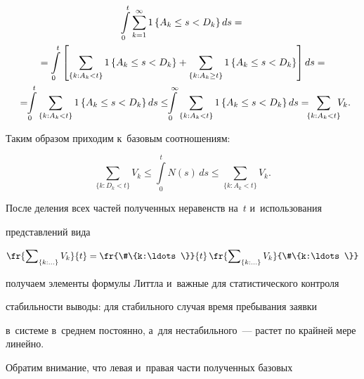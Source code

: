      


     \noindent


     \begin{multline*}


     \int\limits_0^t \sum\limits^\infty_{k=1} 1\left\{ A_k\leq s<D_k\right\}ds= {}\\


     {}=


     \int\limits_0^t\left[ \sum\limits_{\{k: A_k<t\}} 1\left\{ A_k\leq s<D_k\right\} + 


\sum\limits_{\{k: A_k\geq t\}} 1\left\{ A_k\leq s<D_k\right\} \right] ds={}\\


     {}= \!\!\int\limits_0^t \sum\limits_{\{k: A_k<t\}} 1\left\{ A_k\leq s<D_k\right\} ds 


\leq


     \!\!\int\limits_0^\infty \sum\limits_{\{k: A_k<t\}} 1\left\{ A_k\leq s<D_k\right\} ds 


=\!\!\!\sum\limits_{\{k: A_k<t\}}\!\!\! V_k.\hspace*{-2.42pt}


     \end{multline*}


Таким образом приходим к~базовым соотношениям:


$$


\sum\limits_{\{k: D_k<t\}} V_k\leq \int\limits_0^t N(s)\,ds\leq \sum\limits_{\{k: 


A_k<t\}} V_k.


$$


После деления всех частей полученных неравенств на~$t$ и~использования 


пред\-став\-ле\-ний вида


$$


\fr{\sum\nolimits_{\{k: \ldots\}} V_k}{t}=\fr{\#\{k:\ldots\}}{t}\, 


\fr{\sum\nolimits_{\{k:\ldots\}} V_k}{\#\{k:\ldots\}}


$$


получаем элементы формулы Литтла и~важные для статистического контроля 


стабильности выводы: для стабильного случая время пребывания заявки 


в~сис\-те\-ме в~среднем постоянно, а~для нестабильного~--- растет по крайней мере линейно.





     Обратим внимание, что левая и~правая час\-ти полученных базовых 


